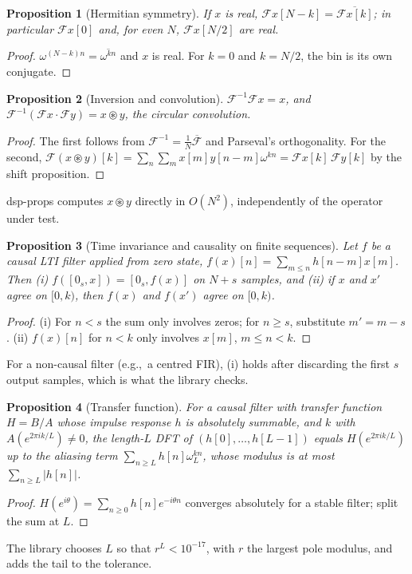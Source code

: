 \documentclass[10pt,conference]{IEEEtran}
\newtheorem{proposition}{Proposition}
\newcommand{\DFT}{\mathcal{F}}
\newcommand{\eg}{e.g.,\ }
\begin{document}
\begin{proposition}[Hermitian symmetry] If $x$ is real, $\DFT x[N-k]=\overline{\DFT x[k]}$;
in particular $\DFT x[0]$ and, for even $N$, $\DFT x[N/2]$ are real.\end{proposition}
\begin{proof} $\omega^{(N-k)n}=\overline{\omega^{kn}}$ and $x$ is real. For
$k=0$ and $k=N/2$, the bin is its own conjugate.\end{proof}

\begin{proposition}[Inversion and convolution] $\DFT^{-1}\DFT x=x$, and
$\DFT^{-1}(\DFT x\cdot\DFT y)=x\circledast y$, the circular convolution.\end{proposition}
\begin{proof} The first follows from $\DFT^{-1}=\frac1N\overline{\DFT}$ and
Parseval's orthogonality. For the second, $\DFT(x\circledast y)[k]
=\sum_n\sum_m x[m]y[n-m]\omega^{kn}=\DFT x[k]\,\DFT y[k]$ by the shift
proposition.\end{proof}
dsp-props computes $x\circledast y$ directly in $O(N^2)$, independently of
the operator under test.

\begin{proposition}[Time invariance and causality on finite sequences] Let
$f$ be a causal LTI filter applied from zero state, $f(x)[n]=\sum_{m\le n}h[n-m]x[m]$.
Then (i) $f([0_s,x])=[0_s,f(x)]$ on $N+s$ samples, and (ii) if $x$ and $x'$
agree on $[0,k)$, then $f(x)$ and $f(x')$ agree on $[0,k)$.\end{proposition}
\begin{proof} (i) For $n<s$ the sum only involves zeros; for $n\ge s$,
substitute $m'=m-s$. (ii) $f(x)[n]$ for $n<k$ only involves $x[m]$, $m\le n<k$.
\end{proof}
For a non-causal filter (\eg a centred FIR), (i) holds after discarding the
first $s$ output samples, which is what the library checks.

\begin{proposition}[Transfer function] For a causal filter with
transfer function $H=B/A$ whose impulse response $h$ is absolutely summable,
and $k$ with $A(e^{2\pi ik/L})\neq0$, the length-$L$ DFT of
$(h[0],\dots,h[L-1])$ equals $H(e^{2\pi i k/L})$ up to the aliasing term
$\sum_{n\ge L}h[n]\omega_L^{kn}$, whose modulus is at most $\sum_{n\ge L}|h[n]|$.
\end{proposition}
\begin{proof} $H(e^{i\theta})=\sum_{n\ge0}h[n]e^{-i\theta n}$ converges
absolutely for a stable filter; split the sum at $L$.\end{proof}
The library chooses $L$ so that $r^L<10^{-17}$, with $r$ the largest pole
modulus, and adds the tail to the tolerance.
\end{document}
